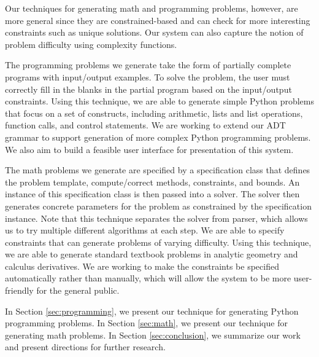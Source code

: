 Our techniques for generating math and programming problems, however, are more general since they are constrained-based and can check for more interesting constraints such as unique solutions. Our system can also capture the notion of problem difficulty using complexity functions. 

The programming problems we generate take the form of partially complete programs with input/output examples. To solve the problem, the user must correctly fill in the blanks in the partial program based on the input/output constraints. Using this technique, we are able to generate simple Python problems that focus on a set of constructs, including arithmetic, lists and list operations, function calls, and control statements. We are working to extend our ADT grammar to support generation of more complex Python programming problems. We also aim to build a feasible user interface for presentation of this system.

The math problems we generate are specified by a specification class that defines the problem template, compute/correct methods, constraints, and bounds. An instance of this specification class is then passed into a solver. The solver then generates concrete parameters for the problem as constrained by the specification instance. Note that this technique separates the solver from parser, which allows us to try multiple different algorithms at each step. We are able to specify constraints that can generate problems of varying difficulty. Using this technique, we are able to generate standard textbook problems in analytic geometry and calculus derivatives. We are working to make the constraints be specified automatically rather than manually, which will allow the system to be more user-friendly for the general public.

In Section \ref{sec:programming}, we present our technique for generating Python programming problems. In Section \ref{sec:math}, we present our technique for generating math problems. In Section \ref{sec:conclusion}, we summarize our work and present directions for further research.

